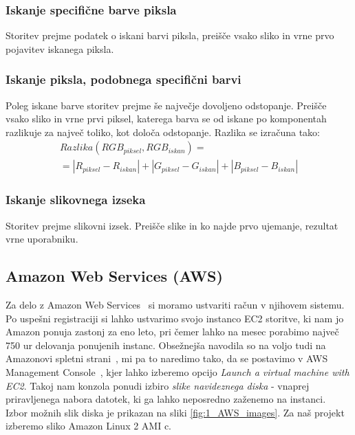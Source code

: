 \subsubsection{Iskanje specifične barve piksla}

Storitev prejme podatek o iskani barvi piksla, preišče vsako sliko in vrne prvo pojavitev iskanega piksla.

\subsubsection{Iskanje piksla, podobnega specifični barvi}

Poleg iskane barve storitev prejme še največje dovoljeno odstopanje.
Preišče vsako sliko in vrne prvi piksel, katerega barva se od iskane po komponentah razlikuje za največ toliko, kot določa odstopanje.
Razlika se izračuna tako:
\begin{multline}
Razlika(RGB_{piksel}, RGB_{iskan}) = \\ = |R_{piksel} - R_{iskan}| + |G_{piksel} - G_{iskan}| + |B_{piksel} - B_{iskan}|
\end{multline}

\subsubsection{Iskanje slikovnega izseka}

Storitev prejme slikovni izsek.
Preišče slike in ko najde prvo ujemanje, rezultat vrne uporabniku.

\subsection{Amazon Web Services (AWS)}

Za delo z Amazon Web Services~\cite{aws_amazon} si moramo ustvariti račun v njihovem sistemu. Po uspešni registraciji si lahko ustvarimo svojo instanco EC2 storitve, ki nam jo Amazon ponuja zastonj za eno leto, pri čemer lahko na mesec porabimo največ 750 ur delovanja ponujenih instanc. Obsežnejša navodila so na voljo tudi na Amazonovi spletni strani~\cite{aws_amazon_tutorial}, mi pa to naredimo tako, da se postavimo v AWS Management Console~\cite{aws_amazon_console}, kjer lahko izberemo opcijo \emph{Launch a virtual machine with EC2}. Takoj nam konzola ponudi izbiro \emph{slike navideznega diska} - vnaprej priravljenega nabora datotek, ki ga lahko neposredno zaženemo na instanci.~\cite{aws_amazon_ami} Izbor možnih slik diska je prikazan na sliki \ref{fig:1_AWS_images}. Za naš projekt izberemo sliko Amazon Linux 2 AMI c.

